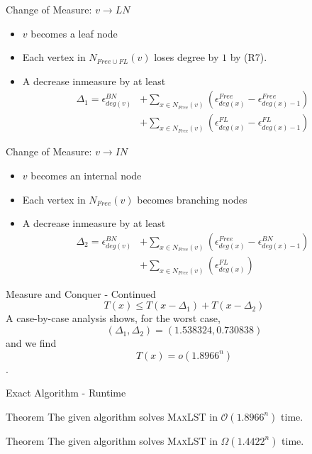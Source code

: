 \documentclass{beamer}
\begin{document}
\begin{frame}{Change of Measure: $v \rightarrow LN$}
    \begin{itemize}
        \item<1-> $v$ becomes a leaf node 
        \item<2-> Each vertex in $N_{Free \cup FL}(v)$ loses degree by $1$  by (R7).
        \item<3-> {A decrease inmeasure by at least 
        \begin{align*}
        \Delta_1 = \epsilon_{deg(v)}^{BN} &+ \sum_{x \in N_{Free}(v)}(\epsilon_{deg(x)}^{Free} - \epsilon_{deg(x)-1}^{Free}) \\ &+ \sum_{x \in N_{Free}(v)}(\epsilon_{deg(x)}^{FL} - \epsilon_{deg(x)-1}^{FL}) 
        \end{align*}
        }
    \end{itemize}
\end{frame}


\begin{frame}{Change of Measure: $v \rightarrow IN$}
    \begin{itemize}
        \item<1-> $v$ becomes an internal node 
        \item<2-> Each vertex in $N_{Free}(v)$ becomes branching nodes 
        \item<3-> {A decrease inmeasure by at least 
        \begin{align*}
        \Delta_2 = \epsilon_{deg(v)}^{BN} &+ \sum_{x \in N_{Free}(v)}(\epsilon_{deg(x)}^{Free} - \epsilon_{deg(x)-1}^{BN}) \\ &+ \sum_{x \in N_{Free}(v)}(\epsilon_{deg(x)}^{FL})
        \end{align*}
        }
    \end{itemize}
\end{frame}

\begin{frame}{Measure and Conquer - Continued}
    $$T(x) \leq T(x - \Delta_1) + T(x - \Delta_2) $$
    \hspace{1 cm}
    A case-by-case analysis shows, for the worst case, $$(\Delta_1, \Delta_2) = (1.538324, 0.730838)$$ and we find $$T(x) = o(1.8966^n)$$.
\end{frame}

\begin{frame}{Exact Algorithm - Runtime}
    \hspace{1 cm}
    \begin{block}{Theorem}
        The given algorithm solves \textsc{MaxLST} in $\mathcal{O}(1.8966^n)$ time. 
    \end{block}
    \pause 
    \hspace{1 cm}
    \begin{block}{Theorem}
        The given algorithm solves \textsc{MaxLST} in $\Omega(1.4422^n)$ time. 
    \end{block}
\end{frame}
\end{document}
